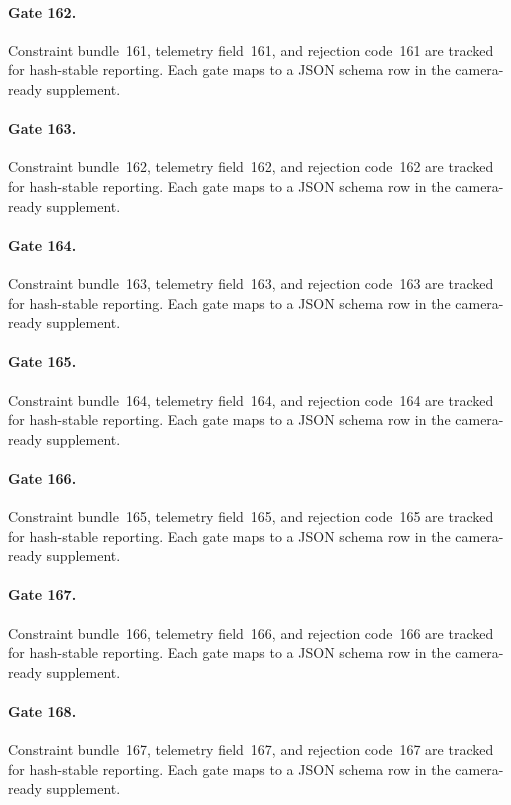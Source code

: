 \documentclass[sigconf,nonacm]{acmart}
\begin{document}
\paragraph{Gate 162.}
Constraint bundle~161, telemetry field~161, and rejection code~161 are tracked for hash-stable reporting. Each gate maps to a JSON schema row in the camera-ready supplement. %

\paragraph{Gate 163.}
Constraint bundle~162, telemetry field~162, and rejection code~162 are tracked for hash-stable reporting. Each gate maps to a JSON schema row in the camera-ready supplement. %

\paragraph{Gate 164.}
Constraint bundle~163, telemetry field~163, and rejection code~163 are tracked for hash-stable reporting. Each gate maps to a JSON schema row in the camera-ready supplement. %

\paragraph{Gate 165.}
Constraint bundle~164, telemetry field~164, and rejection code~164 are tracked for hash-stable reporting. Each gate maps to a JSON schema row in the camera-ready supplement. %

\paragraph{Gate 166.}
Constraint bundle~165, telemetry field~165, and rejection code~165 are tracked for hash-stable reporting. Each gate maps to a JSON schema row in the camera-ready supplement. %

\paragraph{Gate 167.}
Constraint bundle~166, telemetry field~166, and rejection code~166 are tracked for hash-stable reporting. Each gate maps to a JSON schema row in the camera-ready supplement. %

\paragraph{Gate 168.}
Constraint bundle~167, telemetry field~167, and rejection code~167 are tracked for hash-stable reporting. Each gate maps to a JSON schema row in the camera-ready supplement. %
\end{document}
